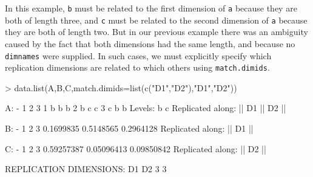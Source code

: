 \documentclass{article}
\newcommand{\code}[1]{\texttt{#1}}
\numberwithin{exercise}{section}
\begin{document}
In this example, \code{b} must be related to the first dimension of \code{a} because they are both of length three, and \code{c} must be related to the second dimension of \code{a} because they are both of length two.  But in our previous example there was an ambiguity caused by the fact that both dimensions had the same length, and because no \code{dimnames} were supplied.  In such cases, we must explicitly specify which replication dimensions are related to which others using \code{match.dimids}.
\begin{Schunk}
\begin{Sinput}
> data.list(A,B,C,match.dimids=list(c("D1","D2"),"D1","D2"))
\end{Sinput}
\begin{Soutput}
A:
-
  1 2 3
1 b b b
2 b c c
3 c b b
Levels: b c
Replicated along:  || D1 || D2 || 


B:
-
        1         2         3 
0.1699835 0.5148565 0.2964128 
Replicated along:  || D1 || 


C:
-
         1          2          3 
0.59257387 0.05096413 0.09850842 
Replicated along:  || D2 || 


REPLICATION DIMENSIONS: 
D1 D2 
 3  3 
\end{Soutput}
\end{Schunk}



\end{document}
